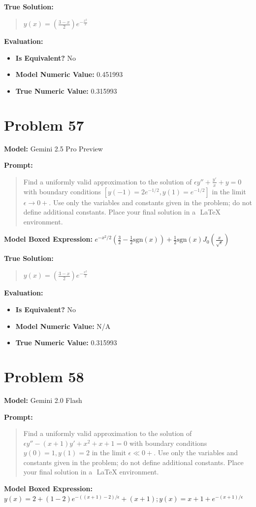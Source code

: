 \documentclass{article}
\begin{document}
\textbf{True Solution:}
\begin{quote}
$y(x)=\left(\frac{3-x}{2}\right)e^{-\frac{x^2}{2}}$
\end{quote}

\textbf{Evaluation:}
\begin{itemize}
\item \textbf{Is Equivalent?} No
\item \textbf{Model Numeric Value:} 0.451993
\item \textbf{True Numeric Value:} 0.315993
\end{itemize}
\vspace{1cm}
\section*{Problem 57}
\textbf{Model:} Gemini 2.5 Pro Preview

\textbf{Prompt:}
\begin{quote}
Find a uniformly valid approximation to the solution of $\epsilon y''+\frac{y'}{x}+y=0$ with boundary conditions $[y(-1)=2e^{-1/2}, y(1)=e^{-1/2}]$ in the limit $\epsilon \rightarrow 0+$. Use only the variables and constants given in the problem; do not define additional constants. Place your final solution in a $\boxed{}$ LaTeX environment.
\end{quote}
\textbf{Model Boxed Expression:} $e^{-x^2/2}\left(\frac{3}{2} - \frac{1}{2}\mathrm{sgn}(x)\right) + \frac{1}{2}\mathrm{sgn}(x)J_0\left(\frac{x}{\sqrt{\epsilon}}\right)$

\textbf{True Solution:}
\begin{quote}
$y(x)=\left(\frac{3-x}{2}\right)e^{-\frac{x^2}{2}}$
\end{quote}

\textbf{Evaluation:}
\begin{itemize}
\item \textbf{Is Equivalent?} No
\item \textbf{Model Numeric Value:} N/A
\item \textbf{True Numeric Value:} 0.315993
\end{itemize}
\vspace{1cm}
\section*{Problem 58}
\textbf{Model:} Gemini 2.0 Flash

\textbf{Prompt:}
\begin{quote}
Find a uniformly valid approximation to the solution of $\epsilon y'' - (x+1) y' + x^2 + x + 1 = 0$ with boundary conditions $y(0) = 1, y(1) = 2$ in the limit $\epsilon \ll 0+$. Use only the variables and constants given in the problem; do not define additional constants. Place your final solution in a $\boxed{}$ LaTeX environment.
\end{quote}
\textbf{Model Boxed Expression:} $y(x) = 2 + (1-2)e^{-((x+1)-2)/\epsilon} + (x+1); y(x) = x+1 + e^{-(x+1)/\epsilon}$
\end{document}
